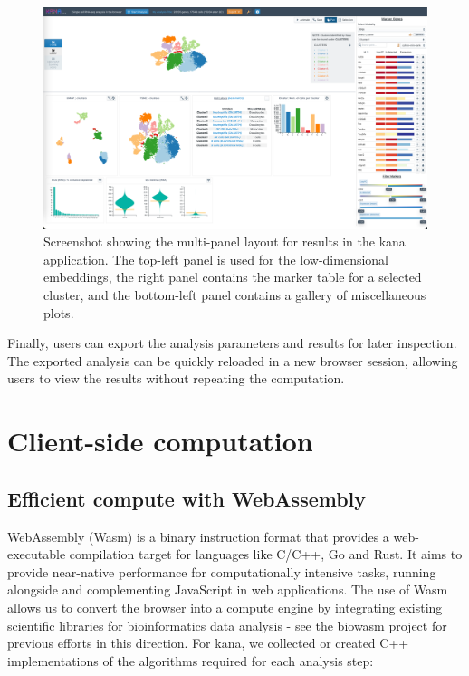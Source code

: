 \documentclass{article}
\begin{document}
\begin{figure}[htbp]
\begin{center}
\includegraphics[width=\textwidth]{screenshots/results.png}
\end{center}
\caption{Screenshot showing the multi-panel layout for results in the kana application.
The top-left panel is used for the low-dimensional embeddings,
the right panel contains the marker table for a selected cluster,
and the bottom-left panel contains a gallery of miscellaneous plots.}
\label{screenshot:results}
\end{figure}

Finally, users can export the analysis parameters and results for later inspection.
The exported analysis can be quickly reloaded in a new browser session, allowing users to view the results without repeating the computation.

\section{Client-side computation}

\subsection{Efficient compute with WebAssembly}

WebAssembly (Wasm) \cite{haas2017bringing} is a binary instruction format that provides a web-executable compilation target for languages like C/C++, Go and Rust.
It aims to provide near-native performance for computationally intensive tasks, running alongside and complementing JavaScript in web applications.
The use of Wasm allows us to convert the browser into a compute engine by integrating existing scientific libraries for bioinformatics data analysis -
see the biowasm project \cite{biowasm} for previous efforts in this direction.
For kana, we collected or created C++ implementations of the algorithms required for each analysis step:
\end{document}
